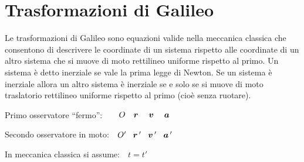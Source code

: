 \section{Trasformazioni di Galileo}
Le trasformazioni di Galileo sono equazioni valide nella meccanica classica che consentono di descrivere le coordinate di un sistema rispetto alle coordinate di un altro sistema che si muove di moto rettilineo uniforme rispetto al primo. Un sistema è detto inerziale se vale la prima legge di Newton. Se un sistema è inerziale allora un altro sistema è inerziale se e solo se si muove di moto traslatorio rettilineo uniforme rispetto al primo (cioè senza ruotare).
\newline

Primo osservatore ``fermo'':$\qquad O\quad\boldsymbol{r}\quad\;\boldsymbol{v}\quad\;\boldsymbol{a}$

Secondo osservatore in moto:$\quad O'\quad\!\boldsymbol{r}\,'\quad\!\boldsymbol{v}\,'\quad\!\boldsymbol{a}\,'$

In meccanica classica si assume:$\quad t=t'$

